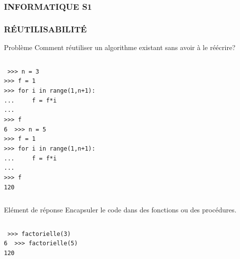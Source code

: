 

\begin{frame}
\frametitle{\uppercase{Informatique \hfill {S1}}}
\titlepage

\end{frame}


\begin{frame}
\frametitle{\uppercase{Réutilisabilité}}
\begin{block}{Problème}
Comment réutiliser un algorithme existant sans avoir à le réécrire?
\end{block}

\begin{columns}[T]
\column{5.25cm}\footnotesize\tt
{>}{>}> n = 3\\
{>}{>}> f = 1\\
{>}{>}> for i in range(1,n+1):\\
...\ \ \ \ \ f = f*i\\
...\\
{>}{>}> f\\
6
\column{5.25cm}\footnotesize\tt
{>}{>}> n = 5\\
{>}{>}> f = 1\\
{>}{>}> for i in range(1,n+1):\\
...\ \ \ \ \ f = f*i\\
...\\
{>}{>}> f\\
120
\end{columns}
\begin{block}{Elément de réponse}
Encapsuler le code dans des fonctions ou des procédures.
\end{block}
\begin{columns}[T]
\column{5cm}\footnotesize\tt
{>}{>}> \alert{factorielle(}3\alert{)}\\
6
\column{5cm}\footnotesize\tt
{>}{>}> \alert{factorielle(}5\alert{)}\\
120
\end{columns}

\end{frame}


